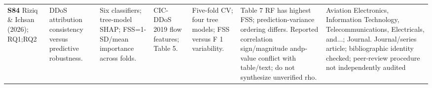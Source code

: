 \begin{longtable}{@{}P{1.55cm}P{2.9cm}P{4.5cm}P{3.2cm}P{3.4cm}P{4.6cm}P{3.6cm}@{}}
\textbf{S84} \cite{S84} Riziq \& Ichsan (2026); RQ1;RQ2 & DDoS attribution consistency versus predictive robustness. & Six classifiers; tree-model SHAP; FSS=1-SD/\allowbreak{}mean importance across folds. & CIC-DDoS 2019 flow features; Table 5. & Five-fold CV; four tree models; FSS versus F 1 variability. & Table 7 RF has highest FSS; prediction-variance ordering differs. Reported correlation sign/\allowbreak{}magnitude andp-value conflict with table/\allowbreak{}text; do not synthesize unverified rho. & Aviation Electronics, Information Technology, Telecommunications, Electricals, and...; Journal. Journal/\allowbreak{}series article; bibliographic identity checked; peer-review procedure not independently audited \\
\end{longtable}
